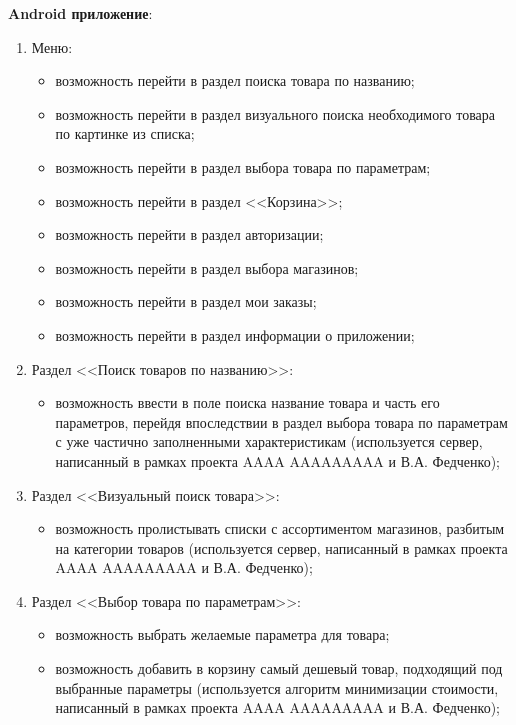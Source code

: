 \documentclass[a4paper,12pt,reqno]{article}
\begin{document}
  \noindent\textbf{Android приложение}:
  \begin{enumerate}
    \item Меню:
    \begin{itemize}
      \item возможность перейти в раздел поиска товара по названию;
      \item возможность перейти в раздел визуального поиска необходимого товара по картинке из списка;
      \item возможность перейти в раздел выбора товара по параметрам;
      \item возможность перейти в раздел <<Корзина>>;
      \item возможность перейти в раздел авторизации;
      \item возможность перейти в раздел выбора магазинов;
      \item возможность перейти в раздел мои заказы;
      \item возможность перейти в раздел информации о приложении;
    \end{itemize}
    \item Раздел <<Поиск товаров по названию>>:
    \begin{itemize}
      \item возможность ввести в поле поиска название товара и часть его параметров, перейдя впоследствии в раздел выбора товара по параметрам с уже частично заполненными характеристикам (используется сервер, написанный в рамках проекта AAAA AAAAAAAAA и В.А. Федченко);
    \end{itemize}
    \item Раздел <<Визуальный поиск товара>>:
    \begin{itemize}
      \item возможность пролистывать списки с ассортиментом магазинов, разбитым на категории товаров (используется сервер, написанный в рамках проекта AAAA AAAAAAAAA и В.А. Федченко);
    \end{itemize}
    \item Раздел <<Выбор товара по параметрам>>:
    \begin{itemize}
      \item возможность выбрать желаемые параметра для товара;
      \item возможность добавить в корзину самый дешевый товар, подходящий под выбранные параметры (используется алгоритм минимизации стоимости, написанный в рамках проекта AAAA AAAAAAAAA и В.А. Федченко);
    \end{itemize}

\end{enumerate}
\end{document}
